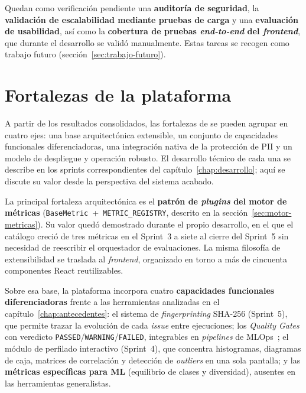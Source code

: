 Quedan como verificación pendiente una \textbf{auditoría de seguridad}, la
\textbf{validación de escalabilidad mediante pruebas de carga} y una
\textbf{evaluación de usabilidad}, así como la \textbf{cobertura de pruebas
\emph{end-to-end} del \emph{frontend}}, que durante el desarrollo se validó
manualmente.  Estas tareas se recogen como trabajo futuro
(sección~\ref{sec:trabajo-futuro}).

\section{Fortalezas de la plataforma}
\label{sec:fortalezas}

A partir de los resultados consolidados, las fortalezas de \dataqual se
pueden agrupar en cuatro ejes: una base arquitectónica extensible, un
conjunto de capacidades funcionales diferenciadoras, una integración
nativa de la protección de \acs{PII} y un modelo de despliegue y operación
robusto.  El desarrollo técnico de cada una se describe en los sprints
correspondientes del capítulo~\ref{chap:desarrollo}; aquí se discute su
valor desde la perspectiva del sistema acabado.

La principal fortaleza arquitectónica es el \textbf{patrón de
\emph{plugins} del motor de métricas}
(\texttt{BaseMetric}~+~\texttt{METRIC\_REGISTRY}, descrito en la
sección~\ref{sec:motor-metricas}).  Su valor quedó demostrado durante el
propio desarrollo, en el que el catálogo creció de tres métricas en el
Sprint~3 a siete al cierre del Sprint~5 sin necesidad de reescribir el
orquestador de evaluaciones.  La misma filosofía de extensibilidad se
traslada al \emph{frontend}, organizado en torno a más de cincuenta
componentes React reutilizables.

Sobre esa base, la plataforma incorpora cuatro \textbf{capacidades
funcionales diferenciadoras} frente a las herramientas analizadas en el
capítulo~\ref{chap:antecedentes}: el sistema de \emph{fingerprinting}
\ac{SHA}-256 (Sprint~5), que permite trazar la evolución de cada
\emph{issue} entre ejecuciones; los \emph{Quality Gates} con veredicto
\texttt{PASSED}/\texttt{WARNING}/\texttt{FAILED}, integrables en
\emph{pipelines} de \ac{MLOps}~\citep{sonarqube}; el módulo de perfilado
interactivo (Sprint~4), que concentra histogramas, diagramas de caja,
matrices de correlación y detección de \emph{outliers} en una sola
pantalla; y las \textbf{métricas específicas para \ac{ML}} (equilibrio
de clases y diversidad), ausentes en las herramientas generalistas.

